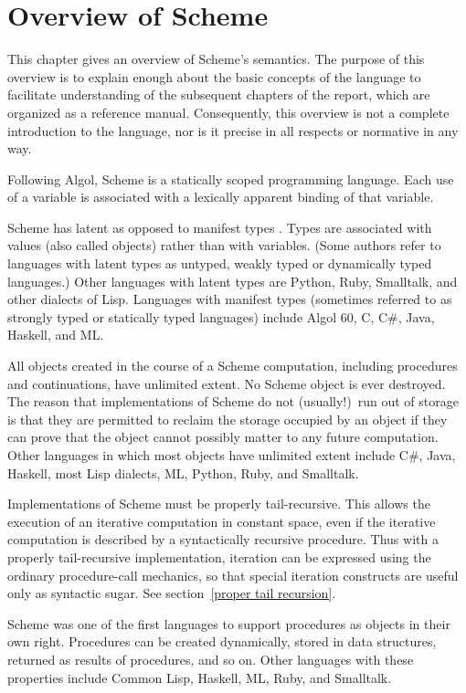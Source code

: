 \chapter{Overview of Scheme}
\label{semanticchapter}

This chapter gives an overview of Scheme's semantics.
The purpose of this overview is to explain
enough about the basic concepts of the language to facilitate
understanding of the subsequent chapters of the report, which are
organized as a reference manual.  Consequently, this overview is
not a complete introduction to the language, nor is it precise
in all respects or normative in any way.

\vest Following Algol, Scheme is a statically scoped programming
language.  Each use of a variable is associated with a lexically
apparent binding of that variable.

\vest Scheme has latent as opposed to manifest types
\cite{WaiteGoos}.  Types
are associated with values (also called objects) rather than
with variables.  (Some authors refer to languages with latent types as
untyped, weakly typed or dynamically typed languages.)  Other languages with
latent types are Python, Ruby, Smalltalk, and other dialects of Lisp.  Languages
with manifest types (sometimes referred to as strongly typed or
statically typed languages) include Algol 60, C, C\#, Java, Haskell, and ML.

\vest All objects created in the course of a Scheme computation, including
procedures and continuations, have unlimited extent.
No Scheme object is ever destroyed.  The reason that
implementations of Scheme do not (usually!)\ run out of storage is that
they are permitted to reclaim the storage occupied by an object if
they can prove that the object cannot possibly matter to any future
computation.  Other languages in which most objects have unlimited
extent include C\#, Java, Haskell, most Lisp dialects, ML, Python,
Ruby, and Smalltalk.

Implementations of Scheme must be properly tail-recursive.
This allows the execution of an iterative computation in constant space,
even if the iterative computation is described by a syntactically
recursive procedure.  Thus with a properly tail-recursive implementation,
iteration can be expressed using the ordinary procedure-call
mechanics, so that special iteration constructs are useful only as
syntactic sugar.  See section~\ref{proper tail recursion}.

\vest Scheme was one of the first languages to support procedures as
objects in their own right.  Procedures can be created dynamically,
stored in data structures, returned as results of procedures, and so
on.  Other languages with these properties include Common Lisp,
Haskell, ML, Ruby, and Smalltalk.

